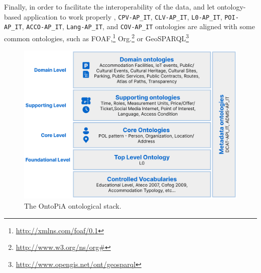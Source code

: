 Finally, in order to facilitate the interoperability of the data, and let ontology-based application to work properly \cite{euzenat2008ontology}, \verb#CPV-AP_IT#, \verb#CLV-AP_IT#, \verb#L0-AP_IT#, \verb#POI-AP_IT#, \verb#ACCO-AP_IT#, \verb#Lang-AP_IT#, and \verb#COV-AP_IT# ontologies are aligned with some common ontologies, such as FOAF,\footnote{\url{http://xmlns.com/foaf/0.1}} Org.\footnote{\url{http://www.w3.org/ns/org\#}} or GeoSPARQL\footnote{\url{http://www.opengis.net/ont/geosparql}}

\begin{figure}[!ht]
  \centering
  \includegraphics[width=0.8\columnwidth]{images/ontopia/ontopia-stack}
  \caption{The OntoPiA ontological stack.}
  \label{fig:ontopia-stack}
\end{figure}

